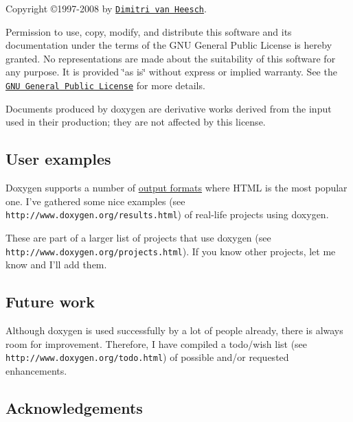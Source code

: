  

Copyright \copyright 1997-2008 by \href{mailto:dimitri@stack.nl}{\tt Dimitri van Heesch}.

Permission to use, copy, modify, and distribute this software and its documentation under the terms of the GNU General Public License is hereby granted. No representations are made about the suitability of this software for any purpose. It is provided \char`\"{}as is\char`\"{} without express or implied warranty. See the \href{http://www.gnu.org/licenses/old-licenses/gpl-2.0.html}{\tt GNU General Public License} for more details. 

Documents produced by doxygen are derivative works derived from the input used in their production; they are not affected by this license.

\subsection*{User examples}

Doxygen supports a number of \hyperlink{output}{output formats} where HTML is the most popular one. I've gathered   
some nice examples (see {\tt http://www.doxygen.org/results.html})
 of real-life projects using doxygen.

These are part of a larger   
list of projects that use doxygen (see {\tt http://www.doxygen.org/projects.html}).
 If you know other projects, let me know and I'll add them.

\subsection*{Future work}

Although doxygen is used successfully by a lot of people already, there is always room for improvement. Therefore, I have compiled a   
todo/wish list (see {\tt http://www.doxygen.org/todo.html})
 of possible and/or requested enhancements.

\subsection*{Acknowledgements}

